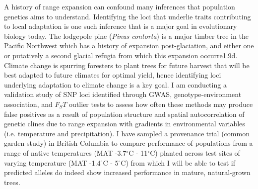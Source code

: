 	A history of range expansion can confound many inferences that population genetics aims to understand. Identifying the loci that underlie traits contributing to local adaptation is one such inference that is a major goal in evolutionary biology today. The lodgepole pine (\emph{Pinus contorta}) is a major timber tree in the Pacific Northwest which has a history of expansion post-glaciation, and either one or putatively a second glacial refugia from which this expansion occurre1.9d. Climate change is spurring foresters to plant trees for future harvest that will be best adapted to future climates for optimal yield, hence identifying loci underlying adaptation to climate change is a key goal. I am conducting a validation study of SNP loci identified through GWAS, genotype-environment association, and $F_ST$ outlier tests to assess how often these methods may produce false positives as a result of population structure and spatial autocorrelation of genetic clines due to range expansion with gradients in environmental variables (i.e. temperature and precipitation). I have sampled a provenance trial (common garden study) in British Columbia to compare performance of populations from a range of native temperatures (MAT -3.7$^{\circ}$C - 11$^{\circ}$C) planted across test sites of varying temperature (MAT -1.4$^{\circ}$C - 5$^{\circ}$C) from which I will be able to test if predicted alleles do indeed show increased performance in mature, natural-grown trees.
	


